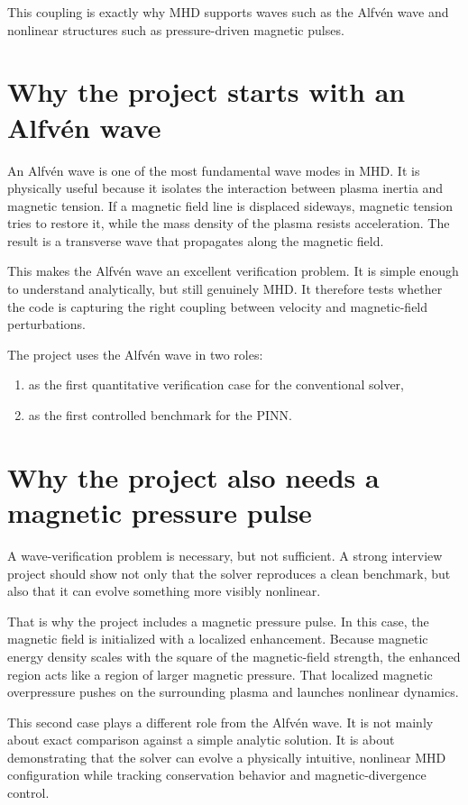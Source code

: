 \documentclass[11pt]{article}
\begin{document}
This coupling is exactly why MHD supports waves such as the Alfv\'en wave and nonlinear structures such as pressure-driven magnetic pulses.

\section{Why the project starts with an Alfv\'en wave}

An Alfv\'en wave is one of the most fundamental wave modes in MHD. It is physically useful because it isolates the interaction between plasma inertia and magnetic tension. If a magnetic field line is displaced sideways, magnetic tension tries to restore it, while the mass density of the plasma resists acceleration. The result is a transverse wave that propagates along the magnetic field.

This makes the Alfv\'en wave an excellent verification problem. It is simple enough to understand analytically, but still genuinely MHD. It therefore tests whether the code is capturing the right coupling between velocity and magnetic-field perturbations.

The project uses the Alfv\'en wave in two roles:
\begin{enumerate}[leftmargin=1.8em]
    \item as the first quantitative verification case for the conventional solver,
    \item as the first controlled benchmark for the PINN.
\end{enumerate}

\section{Why the project also needs a magnetic pressure pulse}

A wave-verification problem is necessary, but not sufficient. A strong interview project should show not only that the solver reproduces a clean benchmark, but also that it can evolve something more visibly nonlinear.

That is why the project includes a magnetic pressure pulse. In this case, the magnetic field is initialized with a localized enhancement. Because magnetic energy density scales with the square of the magnetic-field strength, the enhanced region acts like a region of larger magnetic pressure. That localized magnetic overpressure pushes on the surrounding plasma and launches nonlinear dynamics.

This second case plays a different role from the Alfv\'en wave. It is not mainly about exact comparison against a simple analytic solution. It is about demonstrating that the solver can evolve a physically intuitive, nonlinear MHD configuration while tracking conservation behavior and magnetic-divergence control.
\end{document}

